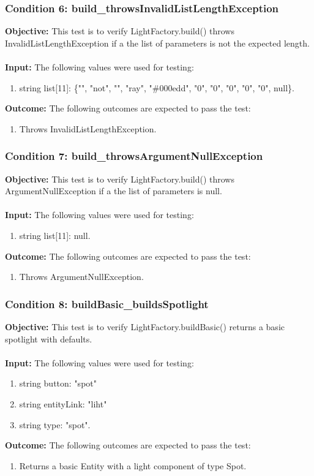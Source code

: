 \documentclass[a4paper,12pt]{article}
\begin{document}
		\subsubsection{Condition 6: build\_throwsInvalidListLengthException}
			\textbf{Objective:} This test is to verify  LightFactory.build() throws InvalidListLengthException if a the list of parameters is not the expected length.\\\\
			\textbf{Input:} The following values were used for testing:
				\begin{enumerate}
					\item string list[11]: \{"", "not", "", "ray", "\#000edd", "0", "0", "0", "0", "0", null\}.
				\end{enumerate}
			\textbf{Outcome:} The following outcomes are expected to pass the test:
				\begin{enumerate}
					\item Throws InvalidListLengthException.
				\end{enumerate}
		\subsubsection{Condition 7: build\_throwsArgumentNullException}
			\textbf{Objective:} This test is to verify  LightFactory.build() throws ArgumentNullException if a the list of parameters is null.\\\\
			\textbf{Input:} The following values were used for testing:
				\begin{enumerate}
					\item string list[11]: null.
				\end{enumerate}
			\textbf{Outcome:} The following outcomes are expected to pass the test:
				\begin{enumerate}
					\item Throws ArgumentNullException.
				\end{enumerate}
		\subsubsection{Condition 8: buildBasic\_buildsSpotlight}
			\textbf{Objective:} This test is to verify  LightFactory.buildBasic() returns a basic spotlight with defaults.\\\\
			\textbf{Input:} The following values were used for testing:
				\begin{enumerate}
					\item string button: "spot"
					\item string entityLink: "liht"
					\item string type: "spot".
				\end{enumerate}
			\textbf{Outcome:} The following outcomes are expected to pass the test:
				\begin{enumerate}
					\item Returns a basic Entity with a light component of type Spot.
				\end{enumerate}
\end{document}
